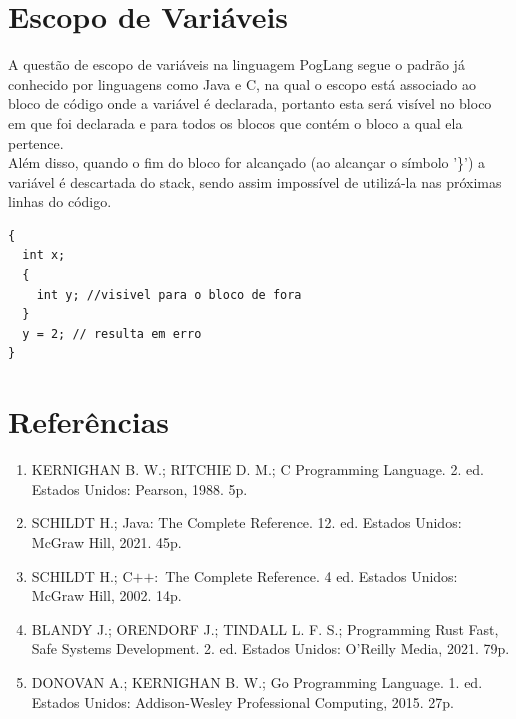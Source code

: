 \documentclass[12pt, letterpaper]{article}
\newcommand\tab[1][1cm]{\hspace*{#1}}
\begin{document}
\begin{spacing}{1.5}
\end{spacing}

\section{Escopo de Variáveis}
\tab A questão de escopo de variáveis na linguagem PogLang segue o padrão já conhecido por
linguagens como Java e C, na qual o escopo está associado ao bloco de código onde a 
variável é declarada, portanto esta será visível no bloco em que foi declarada e para 
todos os blocos que contém o bloco a qual ela pertence.\\[1.0mm]
\tab Além disso, quando o fim do bloco for alcançado (ao alcançar o símbolo '\}') a variável
é descartada do stack, sendo assim impossível de utilizá-la nas próximas linhas do código.

\begin{spacing}{1.5}
\end{spacing}

\begin{lstlisting}[caption=Exemplo de escopo]
{
  int x;
  {
    int y; //visivel para o bloco de fora    
  }
  y = 2; // resulta em erro
} 
\end{lstlisting}

\begin{spacing}{1.5}
\end{spacing}

\section{Referências}
\begin{enumerate}
  \item KERNIGHAN B. W.; RITCHIE D. M.; C Programming Language. 2. ed. Estados Unidos: Pearson, 1988. 5p.
  \item SCHILDT H.; Java: The Complete Reference. 12. ed. Estados Unidos: McGraw Hill, 2021. 45p.
  \item SCHILDT H.; C$++:$ The Complete Reference. 4 ed. Estados Unidos: McGraw Hill, 2002. 14p.
  \item BLANDY J.; ORENDORF J.; TINDALL L. F. S.; Programming Rust Fast, Safe Systems Development. 2. ed. Estados
        Unidos: O'Reilly Media, 2021. 79p.
  \item DONOVAN A.; KERNIGHAN B. W.; Go Programming Language. 1. ed. Estados Unidos: Addison-Wesley Professional Computing,
        2015. 27p.
     
\end{enumerate}
\end{document}
